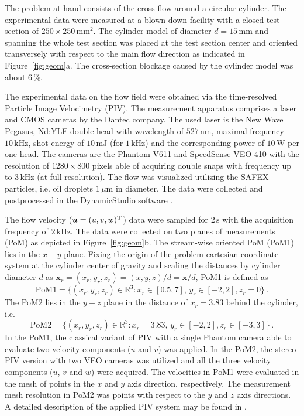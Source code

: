 The problem at hand consists of the cross-flow around a circular cylinder. The experimental data were measured at a blown-down facility with a closed test section of $250\times 250\,\mathrm{mm}^{2}$. The cylinder model of diameter $d = 15 \,\mathrm{mm}$ and spanning the whole test section was placed at the test section center and oriented transversely with respect to the main flow direction as indicated in Figure~\ref{fig:geom}a. The cross-section blockage caused by the cylinder model was about $6\,\%$.{}

The experimental data on the flow field were obtained via the time-resolved Particle Image Velocimetry (PIV). The measurement apparatus comprises a laser and CMOS cameras by the Dantec company. The used laser is the New Wave Pegasus, Nd:YLF double head with wavelength of $527\, \mathrm{nm}$, maximal frequency $10\, \mathrm{kHz}$, shot energy of $10\, \mathrm{mJ}$ (for $1\, \mathrm{kHz}$) and the corresponding power of $10\, \mathrm{W}$ per one head. The cameras are the Phantom V611 and SpeedSense VEO 410 with the resolution of $1 280 \times 800$ pixels able of acquiring double snaps with frequency up to $3\, \mathrm{kHz}$ (at full resolution). The flow was visualized utilizing the SAFEX particles, i.e. oil droplets $1\,\mu \mathrm{m}$ in diameter. The data were collected and postprocessed in the DynamicStudio software \cite{dynamicsStudio}.

The flow velocity ($\bm{u} = (u,v,w)^{\mathrm{T}}$) data were sampled for $2\,\mathrm{s}$ with the acquisition frequency of $2\,\mathrm{kHz}$. The data were collected on two planes of measurements (PoM) as depicted in Figure~\ref{fig:geom}b. The stream-wise oriented PoM (PoM1) lies in the $x-y$ plane. Fixing the origin of the problem cartesian coordinate system at the cylinder center of gravity {and scaling the distances by cylinder diameter $d$ as $\bm{x}_{r} = (x_r,y_{r},z_{r}) = (x,y,z)/d = \bm{x}/d$}, PoM1 is defined as 
\begin{equation}
    \label{eq:POM1}
    {\mathrm{PoM1} = \{(x_r,y_r,z_r)\in\mathbb{R}^{3}:x_r\in [0.5,7],\,y_r\in[-2,2],z_r=0\}}\,.
\end{equation}
The PoM2 lies in the $y-z$ plane in the distance of {$x_r = 3.83$} behind the cylinder, i.e. 
\begin{equation}
    \label{eq:POM1}
    {\mathrm{PoM2} = \{(x_r,y_r,z_r)\in\mathbb{R}^{3}:x_r = 3.83,\,y_r\in[-2,2],z_r\in[-3,3]\}}\,.
\end{equation}
In the PoM1, the classical variant of PIV with a single Phantom camera able to evaluate two velocity components ($u$ and $v$) was applied. In the PoM2, the stereo-PIV version with two VEO cameras was utilized and all the three velocity components ($u$, $v$ and $w$) were acquired. The velocities in PoM1 were evaluated in the mesh of {} points in the $x$ and $y$ axis direction, respectively. The measurement mesh resolution in PoM2 was {} points with respect to the $y$ and $z$ axis directions. A detailed description of the applied PIV system may be found in \cite{prochazka2019}.


